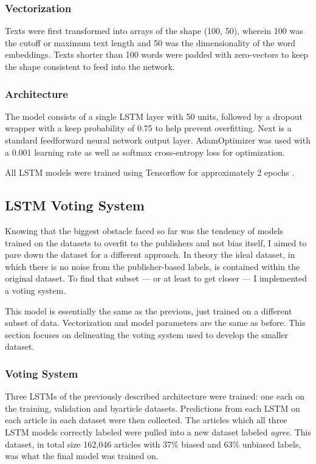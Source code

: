 \documentclass[11pt, a4paper]{article}
\begin{document}
\subsubsection{Vectorization}

Texts were first transformed into arrays of the shape (100, 50), wherein 100 was the cutoff or maximum text length and 50 was the dimensionality of the word embeddings. Texts shorter than 100 words were padded with zero-vectors to keep the shape consistent to feed into the network.

\subsubsection{Architecture}

The model consists of a single LSTM layer with 50 units, followed by a dropout wrapper with a keep probability of 0.75 to help prevent overfitting. Next is a standard feedforward neural network output layer. AdamOptimizer was used with a 0.001 learning rate as well as softmax cross-entropy loss for optimization.

All LSTM models were trained using Tensorflow for approximately 2 epochs \cite{tensorflow2015-whitepaper}.

\subsection{LSTM Voting System}

Knowing that the biggest obstacle faced so far was the tendency of models trained on the datasets to overfit to the publishers and not bias itself, I aimed to pare down the dataset for a different approach. In theory the ideal dataset, in which there is no noise from the publisher-based labels, is contained within the original dataset. To find that subset --- or at least to get closer --- I implemented a voting system.

This model is essentially the same as the previous, just trained on a different subset of data. Vectorization and model parameters are the same as before. This section focuses on delineating the voting system used to develop the smaller dataset.

\subsubsection{Voting System}

Three LSTMs of the previously described architecture were trained: one each on the training, validation and byarticle datasets. Predictions from each LSTM on each article in each dataset were then collected. The articles which all three LSTM models correctly labeled were pulled into a new dataset labeled \textit{agree}. This dataset, in total size 162,046 articles with 37\% biased and 63\% unbiased labels, was what the final model was trained on.
\end{document}
